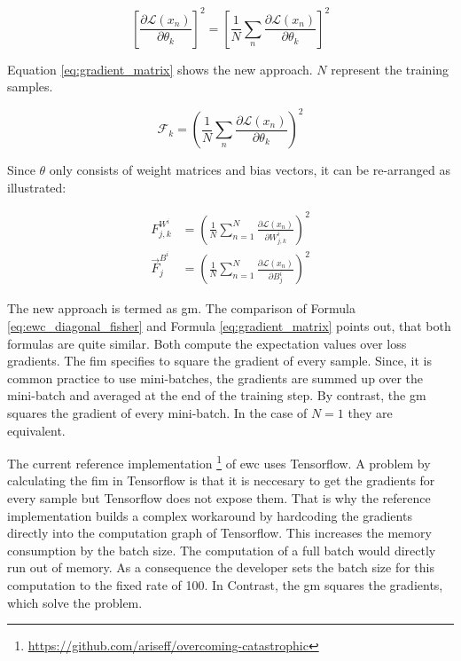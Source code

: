 \begin{equation}
    \left[
        \frac{\partial \mathcal{L}(x_n)}{\partial \theta_k}
        \right]^2
    = 
    \left[
        \frac{1}{N}
        \sum_{n} 
            \frac{\partial \mathcal{L}(x_n)}{\partial \theta_k}
        \right]^2
\end{equation}

Equation \eqref{eq:gradient_matrix} shows the new approach. $N$ represent the training samples.

\begin{equation}
    \mathcal{F}_k =
    \left(
        \frac{1}{N}
        \sum_{n} 
            \frac{\partial \mathcal{L}(x_n)}{\partial \theta_k}
        \right)^2
    \label{eq:gradient_matrix}
\end{equation}

Since $\theta$ only consists of weight matrices and bias vectors, it can be re-arranged as illustrated:

\begin{equation}
    \begin{split}
        F^{W^i}_{j,k} & = 
        \left(
            \frac{1}{N} 
            \sum_{n=1}^{N}
            \frac{\partial \mathcal{L} \left( x_n \right) }{\partial W^i_{j,k}}
        \right)^2
        \\
        \vec{F}^{B^i}_j & = 
        \left(
            \frac{1}{N} 
            \sum_{n=1}^{N} 
            \frac{\partial \mathcal{L} \left( x_n \right) }{\partial B^i_{j}}
        \right)^2
    \end{split}
\end{equation}

The new approach is termed as \acrfull{gm}.
\newline
The comparison of Formula \ref{eq:ewc_diagonal_fisher} and Formula \ref{eq:gradient_matrix} points out, that both formulas are quite similar.
Both compute the expectation values over loss gradients.
\newline
The \acrshort{fim} specifies to square the gradient of every sample.
Since, it is common practice to use mini-batches, the gradients are summed up over the mini-batch and averaged at the end of the training step.
By contrast, the \acrlong{gm} squares the gradient of every mini-batch.
\newline
In the case of $N=1$ they are equivalent.

The current reference implementation \footnote[1]{\url{https://github.com/ariseff/overcoming-catastrophic}} of \acrshort{ewc} uses Tensorflow.
A problem by calculating the \acrshort{fim} in Tensorflow is that it is neccesary to get the gradients for every sample but Tensorflow does not expose them.
That is why the reference implementation builds a complex workaround by hardcoding the gradients directly into the computation graph of Tensorflow.
This increases the memory consumption by the batch size.
The computation of a full batch would directly run out of memory.
As a consequence the developer sets the batch size for this computation to the fixed rate of 100.
In Contrast, the \acrlong{gm} squares the gradients, which solve the problem.
\cite{github_ewc_issue_one}

